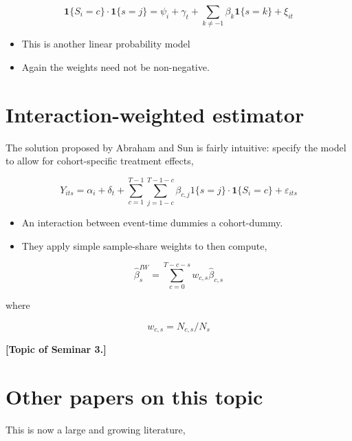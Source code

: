\documentclass[
  letterpaper,
  DIV=11,
  numbers=noendperiod]{scrreprt}
\providecommand{\tightlist}{%
  \setlength{\itemsep}{0pt}\setlength{\parskip}{0pt}}\usepackage{longtable,booktabs,array}
\theoremstyle{definition}
\theoremstyle{remark}
\begin{document}
\[
\mathbf{1}\{S_i=c\}\cdot\mathbf{1}\{s=j\} = \psi_i + \gamma_t + \sum_{k\neq-1}\beta_k \mathbf{1}\{s=k\} + \xi_{it}
\]

\begin{itemize}
\tightlist
\item
  This is another linear probability model
\item
  Again the weights need not be non-negative.
\end{itemize}

\hypertarget{interaction-weighted-estimator}{%
\section{Interaction-weighted
estimator}\label{interaction-weighted-estimator}}

The solution proposed by Abraham and Sun is fairly intuitive: specify
the model to allow for cohort-specific treatment effects,

\[
Y_{its} = \alpha_i + \delta_t + \sum_{c=1}^{T-1}\sum_{j=1-c}^{T-1-c}\beta_{c,j} 1\{s=j\}\cdot\mathbf{1}\{S_i=c\} + \varepsilon_{its}
\]

\begin{itemize}
\tightlist
\item
  An interaction between event-time dummies a cohort-dummy.
\item
  They apply simple sample-share weights to then compute,
\end{itemize}

\[
\hat{\beta}_s^{IW} = \sum_{c=0}^{T-c-s}w_{c,s} \hat{\beta}_{c,s}
\]

where

\[
w_{c,s} = N_{c,s}/N_{s}
\]

\textbf{{[}Topic of Seminar 3.{]}}

\hypertarget{other-papers-on-this-topic}{%
\section{Other papers on this topic}\label{other-papers-on-this-topic}}

This is now a large and growing literature,
\end{document}
